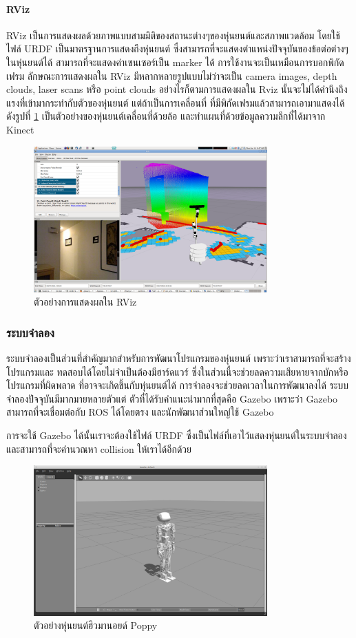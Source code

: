 \paragraph*{RViz}
RViz เป็นการแสดงผลด้วยภาพแบบสามมิติของสถานะต่างๆของหุ่นยนต์และสภาพแวดล้อม โดยใช้ไฟล์ URDF เป็นมาตรฐานการแสดงถึงหุ่นยนต์
ซึ่งสามารถที่จะแสดงตำแหน่งปัจจุบันของข้อต่อต่างๆในหุ่นยนต์ได้ สามารถที่จะแสดงค่าเซนเซอร์เป็น marker ได้
การใช้งานจะเป็นเหมือนการบอกพิกัดเฟรม ลักษณะการแสดงผลใน RViz มีหลากหลายรูปแบบไม่ว่าจะเป็น
camera images, depth clouds, laser scans หรือ point clouds อย่างไรก็ตามการแสดงผลใน Rviz
นั้นจะไม่ได้คำนึงถึงแรงที่เข้ามากระทำกับตัวของหุ่นยนต์ แต่ถ้าเป็นการเคลื่อนที่ ที่มีพิกัดเฟรมแล้วสามารถเอามาแสดงได้
ดังรูปที่ \ref{fig:example_visualization_rviz} เป็นตัวอย่างของหุ่นยนต์เคลื่อนที่ด้วยล้อ และทำแผนที่ด้วยข้อมูลความลึกที่ได้มาจาก Kinect

\clearpage
\begin{figure}[!ht]
    \centering
    \includegraphics[width=0.8\textwidth]{chapter2/images/nav_test_rviz_2.png}
	\caption{ตัวอย่างการแสดงผลใน RViz}
    \label{fig:example_visualization_rviz}
\end{figure}

\subsubsection*{ระบบจำลอง}
ระบบจำลองเป็นส่วนที่สำคัญมากสำหรับการพัฒนาโปรแกรมของหุ่นยนต์ เพราะว่าเราสามารถที่จะสร้างโปรแกรมและ
ทดสอบได้โดยไม่จำเป็นต้องมีฮาร์ดแวร์ ซึ่งในส่วนนี้จะช่วยลดความเสียหายจากบักหรือโปรแกรมที่ผิดพลาด ที่อาจจะเกิดขึ้นกับหุ่นยนต์ได้
การจำลองจะช่วยลดเวลาในการพัฒนาลงได้ ระบบจำลองปัจจุบันมีมากมายหลายตัวแต่ ตัวที่ได้รับคำแนะนำมากที่สุดคือ Gazebo
เพราะว่า Gazebo สามารถที่จะเชื่อมต่อกับ ROS ได้โดยตรง และนักพัฒนาส่วนใหญ่ใช้ Gazebo

การจะใช้ Gazebo ได้นั้นเราจะต้องใช้ไฟล์ URDF ซึ่งเป็นไฟล์ที่เอาไว้แสดงหุ่นยนต์ในระบบจำลอง และสามารถที่จะคำนวณหา collision
ให้เราได้อีกด้วย

\begin{figure}[!ht]
    \centering
    \includegraphics[width=0.8\textwidth]{chapter2/images/gazebo_poppy.png}
	\caption{ตัวอย่างหุ่นยนต์ฮิวมานอยด์ Poppy}
    \label{fig:gazebo_poppy}
\end{figure}

